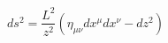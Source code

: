 \begin{equation}
ds^2=\frac {L^2} {z^2} (\eta_{\mu \nu}dx^\mu dx^\nu-dz^2)
\label{metric}
\end{equation}


